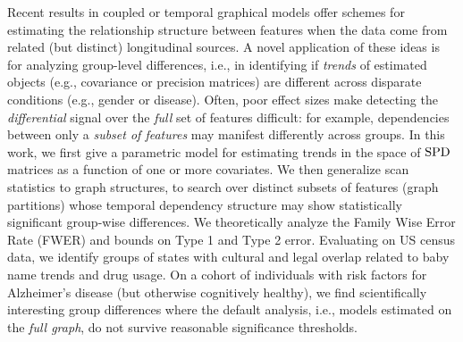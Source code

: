 Recent results in coupled or temporal graphical models offer schemes for estimating the relationship structure 
between features when the data come from
related (but distinct) longitudinal sources. A novel application of these ideas is for analyzing group-level differences, i.e., in identifying if {\em trends} of estimated objects (e.g., 
covariance or precision matrices) are different across disparate conditions (e.g., gender or disease). Often, poor effect sizes make detecting the \textit{differential} signal 
over the {\em full} set of features difficult: for example, 
dependencies between only a {\em subset of features} may manifest differently across groups.
In this work, we first give a parametric model 
for estimating trends in the space of $\text{SPD}$ matrices as a function of one or more covariates. We then generalize scan statistics to graph structures, 
to search over distinct subsets of features (graph partitions) whose temporal dependency structure may show statistically 
significant group-wise differences.
We theoretically analyze the Family Wise Error Rate (FWER) and bounds on Type 1 and Type 2 error. 
Evaluating on US census data, we identify groups of states with cultural and legal overlap related to baby name trends and drug usage.
On a cohort of individuals with risk factors for Alzheimer's disease (but otherwise cognitively healthy), 
we find scientifically interesting 
group differences where the default analysis, i.e., models estimated on the {\em full graph}, do not survive reasonable 
significance thresholds. 
